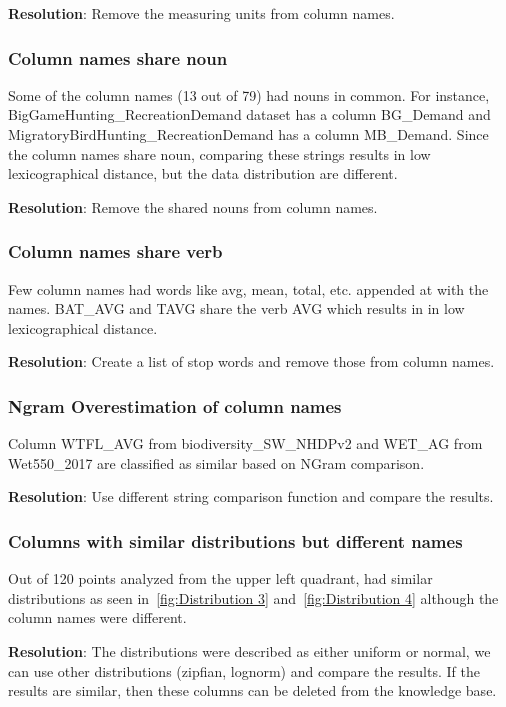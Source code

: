 \textbf{Resolution}: Remove the measuring units from column names.

\subsubsection{Column names share noun}
Some of the column names (13 out of 79) had nouns in common. For instance, BigGameHunting\_RecreationDemand dataset has a column BG\_Demand and MigratoryBirdHunting\_RecreationDemand has a column MB\_Demand. Since the column names share noun, comparing these strings results in low lexicographical distance, but the data distribution are different.

\textbf{Resolution}: Remove the shared nouns from column names.


\subsubsection{Column names share verb}

Few column names had words like avg, mean, total, etc. appended at with the names. BAT\_AVG and TAVG share the verb AVG which results in in low lexicographical distance.

\textbf{Resolution}: Create a list of stop words and remove those from column names.

\subsubsection{Ngram Overestimation of column names}
Column WTFL\_AVG from biodiversity\_SW\_NHDPv2 and WET\_AG from Wet550\_2017 are classified as similar based on NGram comparison. 

\textbf{Resolution}: Use different string comparison function and compare the results.

\subsubsection{Columns with similar distributions but different names}
Out of 120 points analyzed from the upper left quadrant,  had similar distributions as seen in~\ref{fig:Distribution 3} and~\ref{fig:Distribution 4} although the column names were different.

\textbf{Resolution}: The distributions were described as either uniform or normal, we can use other distributions (zipfian, lognorm) and compare the results. If the results are similar, then these columns can be deleted from the knowledge base.

